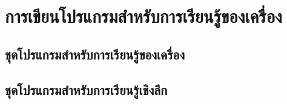 

\section{การเขียนโปรแกรมสำหรับการเรียนรู้ของเครื่อง}
\label{ap:programming}

\subsection{ชุดโปรแกรมสำหรับการเรียนรู้ของเครื่อง}

\subsection{ชุดโปรแกรมสำหรับการเรียนรู้เชิงลึก}
